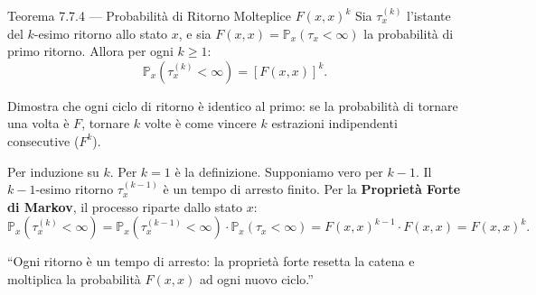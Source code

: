 \documentclass[11pt,a4paper]{report}
\begin{document}
\begin{teoremabox}{Teorema 7.7.4 --- Probabilità di Ritorno Molteplice $F(x,x)^k$}
Sia $\tau_x^{(k)}$ l'istante del $k$-esimo ritorno allo stato $x$, e sia $F(x,x) = \mathbb{P}_x(\tau_x < \infty)$ la probabilità di primo ritorno. Allora per ogni $k \ge 1$:
\[
\mathbb{P}_x(\tau_x^{(k)} < \infty) = [F(x,x)]^k.
\]

\begin{cosafa}
Dimostra che ogni ciclo di ritorno è identico al primo: se la probabilità di tornare una volta è $F$, tornare $k$ volte è come vincere $k$ estrazioni indipendenti consecutive ($F^k$).
\end{cosafa}

\begin{dimostrazione}
Per induzione su $k$. Per $k=1$ è la definizione. Supponiamo vero per $k-1$. Il $k-1$-esimo ritorno $\tau_x^{(k-1)}$ è un tempo di arresto finito. Per la \textbf{Proprietà Forte di Markov}, il processo riparte dallo stato $x$:
\[
\mathbb{P}_x(\tau_x^{(k)} < \infty) = \mathbb{P}_x(\tau_x^{(k-1)} < \infty) \cdot \mathbb{P}_x(\tau_x < \infty) = F(x,x)^{k-1} \cdot F(x,x) = F(x,x)^k.
\]
\end{dimostrazione}

\begin{oralbox}
``Ogni ritorno è un tempo di arresto: la proprietà forte resetta la catena e moltiplica la probabilità $F(x,x)$ ad ogni nuovo ciclo.''
\end{oralbox}
\end{teoremabox}

\newpage
\end{document}
